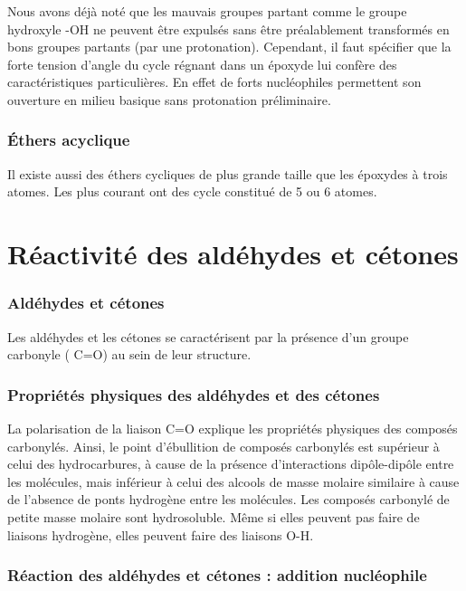 Nous avons déjà noté que les mauvais groupes partant comme le groupe hydroxyle -OH ne peuvent être expulsés sans être préalablement  transformés en bons groupes partants (par une protonation).
Cependant, il faut spécifier que la forte tension d'angle du cycle régnant dans un époxyde lui confère des caractéristiques particulières.
En effet de forts nucléophiles permettent son ouverture en milieu basique sans protonation préliminaire.



\section{\'Ethers acyclique}
Il existe aussi des éthers cycliques de plus grande taille que les époxydes à trois atomes.
Les plus courant ont des cycle constitué de 5 ou 6 atomes.







\part{Réactivité des aldéhydes et cétones}

\section{Aldéhydes et cétones}
Les aldéhydes et les cétones se caractérisent par la présence d'un groupe carbonyle ( C=O) au sein de leur structure.

\section{Propriétés physiques des aldéhydes et des cétones}

La polarisation de la liaison C=O explique les propriétés physiques des composés carbonylés.
Ainsi, le point d'ébullition de composés carbonylés est supérieur à celui des hydrocarbures, à cause de la présence d'interactions dipôle-dipôle entre les molécules, mais inférieur à celui des alcools de masse molaire similaire à cause de l'absence de ponts hydrogène entre les molécules.
Les composés carbonylé de petite masse molaire sont hydrosoluble.
Même si elles peuvent pas faire de liaisons hydrogène, elles peuvent faire des liaisons O-H.

\section{Réaction des aldéhydes et cétones : addition nucléophile}

